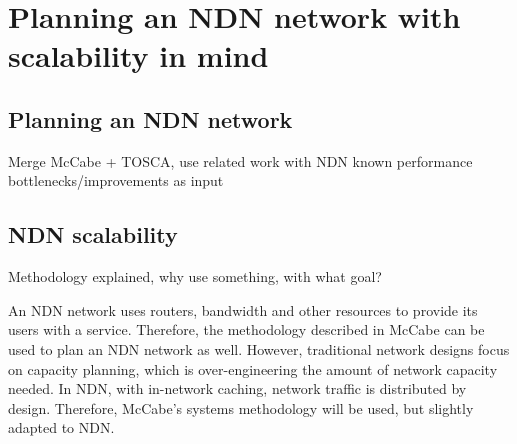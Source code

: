 \section{Planning an NDN network with scalability in mind}











\subsection{Planning an NDN network}
\label{method-planning}

Merge McCabe + TOSCA, use related work with NDN known performance bottlenecks/improvements as input

\subsection{NDN scalability}
Methodology explained, why use something, with what goal?

An NDN network uses routers, bandwidth and other resources to provide its users with a service. Therefore, the methodology described in McCabe can be used to plan an NDN network as well. However, traditional network designs focus on capacity planning, which is over-engineering the amount of network capacity needed. In NDN, with in-network caching, network traffic is distributed by design. Therefore, McCabe's systems methodology will be used, but slightly adapted to NDN. 